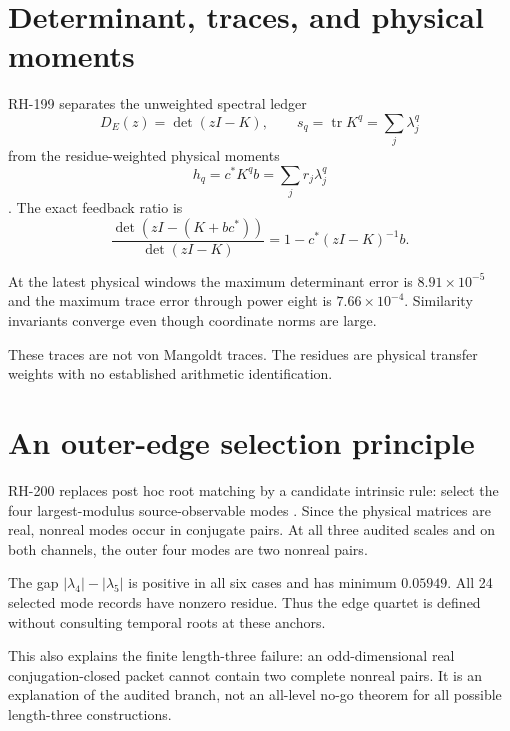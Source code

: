 \documentclass[12pt]{article}
\theoremstyle{remark}
\begin{document}
\section{Determinant, traces, and physical moments}

RH-199 separates the unweighted spectral ledger
\begin{equation}\label{eq:unweighted}
 D_E(z)=\det(zI-K),
 \qquad s_q=\operatorname{tr}K^q=\sum_j\lambda_j^q
\end{equation}
from the residue-weighted physical moments
\begin{equation}\label{eq:weighted}
 h_q=c^*K^qb=\sum_jr_j\lambda_j^q
\end{equation}
\citep{WangRH199}.
The exact feedback ratio is
\begin{equation}\label{eq:feedback-ratio}
 \frac{\det(zI-(K+bc^*))}{\det(zI-K)}
 =1-c^*(zI-K)^{-1}b.
\end{equation}

At the latest physical windows the maximum determinant error is
$8.91\times10^{-5}$ and the maximum trace error through power eight is
$7.66\times10^{-4}$.  Similarity invariants converge even though coordinate
norms are large.

These traces are not von Mangoldt traces.  The residues are physical transfer
weights with no established arithmetic identification.

\section{An outer-edge selection principle}

RH-200 replaces post hoc root matching by a candidate intrinsic rule:
select the four largest-modulus source-observable modes
\citep{WangRH200}.  Since the physical matrices are real, nonreal modes occur
in conjugate pairs.  At all three audited scales and on both channels, the
outer four modes are two nonreal pairs.

The gap $|\lambda_4|-|\lambda_5|$ is positive in all six cases and has
minimum $0.05949$.  All 24 selected mode records have nonzero residue.  Thus
the edge quartet is defined without consulting temporal roots at these
anchors.

This also explains the finite length-three failure: an odd-dimensional real
conjugation-closed packet cannot contain two complete nonreal pairs.  It is
an explanation of the audited branch, not an all-level no-go theorem for all
possible length-three constructions.
\end{document}
